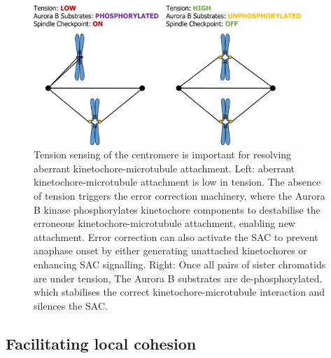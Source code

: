 \begin{figure}[htbp]
  \centering
  \includegraphics[width=0.9\textwidth]{chapter1/figures/tension sensing schematics.pdf}
  \caption[Tension sensing of the centromere is important for resolving aberrant kinetochore-microtubule attachment]{Tension sensing of the centromere is important for resolving aberrant kinetochore-microtubule attachment. Left: aberrant kinetochore-microtubule attachment is low in tension. The absence of tension triggers the error correction machinery, where the Aurora B kinase phosphorylates kinetochore components to destabilise the erroneous kinetochore-microtubule attachment, enabling new attachment. Error correction can also activate the SAC to prevent anaphase onset by either generating unattached kinetochores or enhancing SAC signalling. Right: Once all pairs of sister chromatids are under tension, The Aurora B substrates are de-phosphorylated. which stabilises the correct kinetochore-microtubule interaction and silences the SAC. }
  \label{fig:tensionSensing}
\end{figure}


\subsection{Facilitating local cohesion}

